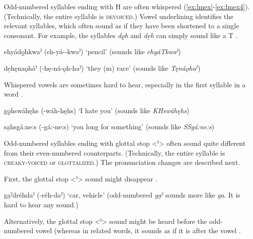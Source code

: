 Odd-numbered syllables ending with H are often whispered (\ref{ex:lmex}-\ref{ex:lmex4}). (Technically, the entire syllable is \textsc{devoiced}.) Vowel underlining identifies the relevant syllables, which often sound as if they have been shortened to a single consonant. For example, the syllables \textit{dǫ̱h} and \textit{de̱h} can simply sound like a T . 

\ea\label{ex:lmex} 
ehyádǫ̱hkwaˀ (eh-yá--kwaˀ) ‘pencil’ (sounds like \textit{ehyáTkwaˀ})
\z

\ea\label{ex:lmex2} 
de̱hęnaǫháˀ (-hę-ná-ǫh-haˀ) ‘they (m) race’ (sounds like \textit{Tęnáǫhaˀ})
\z

Whispered vowels are sometimes hard to hear, especially in the first syllable in a word .

\ea\label{ex:lmex3} 
gǫ̱hswáhęhs (-wáh-hęhs) ‘I hate you’ (sounds like \textit{KHswáhęhs})
\z


\ea\label{ex:lmex4} 
sa̱hsgá:ne:s (-gá:-ne:s) ‘you long for something’ (sounds like \textit{SSgá:ne:s})
\z


Odd-numbered syllables ending with glottal stop <ˀ> often sound quite different from their even-numbered counterparts. (Technically, the entire syllable is \textsc{creaky-voiced} or \textsc{glottalized}.) The pronunciation changes are described next. 

First, the glottal stop <ˀ> sound might disappear .

\ea\label{ex:lmex12}
ga̱ˀdréhdaˀ (-réh-daˀ) ‘car, vehicle’ (odd-numbered \textit{ga̱ˀ} sounds more like \textit{ga}. It is hard to hear any  sound.)
\z


Alternatively, the glottal stop <ˀ> sound might be heard before the odd-numbered vowel (whereas in related words, it sounds as if it is after the vowel .

